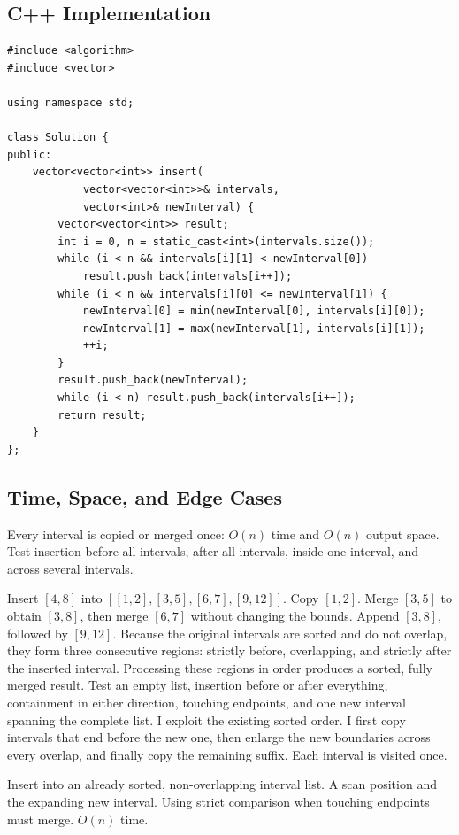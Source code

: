 \subsection{C++ Implementation}
\begin{lstlisting}[style=compactcode,caption={Complete C++ solution: Insert Interval}]
#include <algorithm>
#include <vector>

using namespace std;

class Solution {
public:
    vector<vector<int>> insert(
            vector<vector<int>>& intervals,
            vector<int>& newInterval) {
        vector<vector<int>> result;
        int i = 0, n = static_cast<int>(intervals.size());
        while (i < n && intervals[i][1] < newInterval[0])
            result.push_back(intervals[i++]);
        while (i < n && intervals[i][0] <= newInterval[1]) {
            newInterval[0] = min(newInterval[0], intervals[i][0]);
            newInterval[1] = max(newInterval[1], intervals[i][1]);
            ++i;
        }
        result.push_back(newInterval);
        while (i < n) result.push_back(intervals[i++]);
        return result;
    }
};
\end{lstlisting}

\subsection{Time, Space, and Edge Cases}
Every interval is copied or merged once: \(O(n)\) time and \(O(n)\) output
space. Test insertion before all intervals, after all intervals, inside one
interval, and across several intervals.

\lessonexpansion
  {Insert \([4,8]\) into \([[1,2],[3,5],[6,7],[9,12]]\). Copy \([1,2]\).
   Merge \([3,5]\) to obtain \([3,8]\), then merge \([6,7]\) without changing
   the bounds. Append \([3,8]\), followed by \([9,12]\).}
  {Because the original intervals are sorted and do not overlap, they form three
   consecutive regions: strictly before, overlapping, and strictly after the
   inserted interval. Processing these regions in order produces a sorted,
   fully merged result.}
  {Test an empty list, insertion before or after everything, containment in
   either direction, touching endpoints, and one new interval spanning the
   complete list.}
  {I exploit the existing sorted order. I first copy intervals that end before
   the new one, then enlarge the new boundaries across every overlap, and
   finally copy the remaining suffix. Each interval is visited once.}

\chaptercheckpoint
  {Insert into an already sorted, non-overlapping interval list.}
  {A scan position and the expanding new interval.}
  {Using strict comparison when touching endpoints must merge.}
  {$O(n)$ time.}


